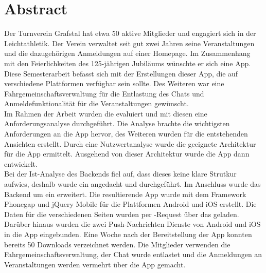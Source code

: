 %
%

\thispagestyle{empty}



\newpage
\thispagestyle{empty}
\chapter*{Abstract}\label{abstract}
Der Turnverein Grafstal hat etwa 50 aktive Mitglieder und engagiert sich in der Leichtathletik. Der Verein verwaltet seit gut zwei Jahren seine Veranstaltungen und die dazugehörigen Anmeldungen auf einer Homepage. Im Zusammenhang mit den Feierlichkeiten des 125-jährigen Jubiläums wünschte er sich eine App.\\

Diese Semesterarbeit befasst sich mit der Erstellungen dieser App, die auf verschiedene Plattformen verfügbar sein sollte. Des Weiteren war eine Fahrgemeinschaftsverwaltung für die Entlastung des Chats und Anmeldefunktionalität für die Veranstaltungen gewünscht.\\

Im Rahmen der Arbeit wurden die  evaluiert und mit diesen eine Anforderungsanalyse durchgeführt. Die Analyse brachte die wichtigsten Anforderungen an die App hervor, des Weiteren wurden  für die entstehenden Ansichten erstellt. Durch eine Nutzwertanalyse wurde die geeignete Architektur für die App ermittelt. Ausgehend von dieser Architektur wurde die App dann entwickelt.\\

Bei der Ist-Analyse des Backends fiel auf, dass dieses keine klare Strutkur aufwies, deshalb wurde ein  angedacht und durchgeführt. Im Anschluss wurde das Backend um ein   erweitert. Die resultierende App wurde mit dem Framework Phonegap und jQuery Mobile für die Plattformen Android und iOS erstellt. Die Daten für die verschiedenen Seiten wurden per -Request über das   geladen. Darüber hinaus wurden die zwei Push-Nachrichten Dienste von Android und iOS in die App eingebunden. Eine Woche nach der Bereitstellung der App konnten bereits 50 Downloads verzeichnet werden. Die Mitglieder verwenden die Fahrgemeinschaftsverwaltung, der Chat wurde entlastet und die Anmeldungen an Veranstaltungen werden vermehrt über die App gemacht.

